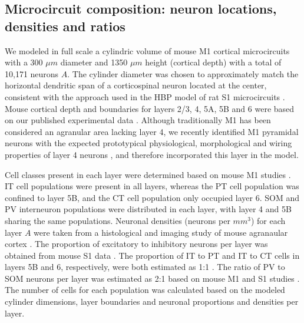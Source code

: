 \subsection{Microcircuit composition: neuron locations, densities and ratios}

We modeled in full scale a cylindric volume of mouse M1 cortical microcircuits with a 300 $\mu m$ diameter and 1350 $\mu m$ height (cortical depth) with a total of 10,171 neurons $A$. The cylinder diameter was chosen to approximately match the horizontal dendritic span of a corticospinal neuron located at the center, consistent with the approach used in the HBP model of rat S1 microcircuits \cite{Mark15}. Mouse cortical depth and boundaries for layers 2/3, 4, 5A, 5B and 6 were based on our published experimental data \cite{Weil08,Ande10,Yama15}. Although traditionally M1 has been considered an agranular area lacking layer 4, we recently identified M1 pyramidal neurons with the expected prototypical physiological, morphological and wiring properties of layer 4 neurons \cite{Yama15}, and therefore incorporated this layer in the model. 


Cell classes present in each layer were determined based on mouse M1 studies \cite{Harr15,Sute13,Ande10,Yama15,Oswa13,Kons14,Naka16}. IT cell populations were present in all layers, whereas the PT cell population was confined to layer 5B, and the CT cell population only occupied layer 6. SOM and PV interneuron populations were distributed in each layer, with layer 4 and 5B sharing the same populations. Neuronal densities (neurons per $mm^{3}$) for each layer $A$ were taken from a histological and imaging study of mouse agranaular cortex \cite{Tsai09}. The proportion of excitatory to inhibitory neurons per layer was obtained from mouse S1 data \cite{Lefo09}. The proportion of IT to PT and IT to CT cells in layers 5B and 6, respectively, were both estimated as 1:1 \cite{Harr15,Sute13,Yama15b}. The ratio of PV to SOM neurons per layer was estimated as 2:1 based on mouse M1 and S1 studies \cite{Katz11,WallD16}. The number of cells for each population was calculated based on the modeled cylinder dimensions, layer boundaries and neuronal proportions and densities per layer.

